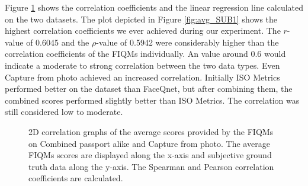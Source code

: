 Figure \ref{fig:corrAVGvsSub} shows the correlation coefficients and the linear regression line calculated on the two datasets. The plot depicted in Figure \ref{fig:avg_SUB1} shows the highest correlation coefficients we ever achieved during our experiment. The $r$-value of 0.6045 and the $\rho$-value of 0.5942 were considerably higher than the correlation coefficients of the FIQMs individually. An value around 0.6 would indicate a moderate to strong correlation between the two data types. Even Capture from photo achieved an increased correlation. Initially ISO Metrics performed better on the dataset than FaceQnet, but after combining them, the combined scores performed slightly better than ISO Metrics. The correlation was still considered low to moderate. 
\begin{figure}[h]
\centering
    \caption{2D correlation graphs of the average scores provided by the FIQMs on Combined passport alike and Capture from photo. The average FIQMs scores are displayed along the x-axis and subjective ground truth data along the y-axis. The Spearman and Pearson correlation coefficients are calculated.}
    \label{fig:corrAVGvsSub}
\end{figure}

